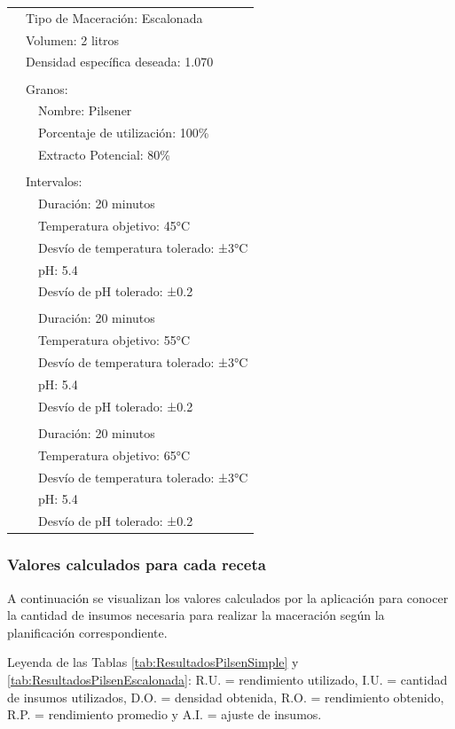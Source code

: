\begin{longtable}{p{0.6cm} p{0.6cm} p{12.8cm}}
        & \multicolumn{2}{l}{Tipo de Maceración: Escalonada} \\
        & \multicolumn{2}{l}{Volumen: 2 litros}  \\
        & \multicolumn{2}{l}{Densidad específica deseada: 1.070} \\
        & & \\
        & \multicolumn{2}{l}{Granos:} \\
        & & Nombre: Pilsener \\
        & & Porcentaje de utilización: 100\% \\
        & & Extracto Potencial: 80\% \\
        & & \\
        & \multicolumn{2}{l}{Intervalos:} \\
        & & Duración: 20 minutos \\
        & & Temperatura objetivo: 45°C \\
        & & Desvío de temperatura tolerado: ±3°C \\
        & & pH: 5.4 \\
        & & Desvío de pH tolerado: ±0.2 \\
        & & \\
        & & Duración: 20 minutos \\
        & & Temperatura objetivo: 55°C \\
        & & Desvío de temperatura tolerado: ±3°C \\
        & & pH: 5.4 \\
        & & Desvío de pH tolerado: ±0.2 \\
        & & \\
        & & Duración: 20 minutos \\
        & & Temperatura objetivo: 65°C \\
        & & Desvío de temperatura tolerado: ±3°C \\
        & & pH: 5.4 \\
        & & Desvío de pH tolerado: ±0.2 \\

        \end{longtable}
    
    \subsubsection{Valores calculados para cada receta}
    \par A continuación se visualizan los valores calculados por la aplicación para conocer la cantidad de insumos necesaria para realizar la maceración según la planificación correspondiente.
    \par Leyenda de las Tablas \ref{tab:ResultadosPilsenSimple} y \ref{tab:ResultadosPilsenEscalonada}: R.U. = rendimiento utilizado, I.U. = cantidad de insumos utilizados, D.O. = densidad obtenida, R.O. = rendimiento obtenido, R.P. = rendimiento promedio y A.I. = ajuste de insumos.
    
